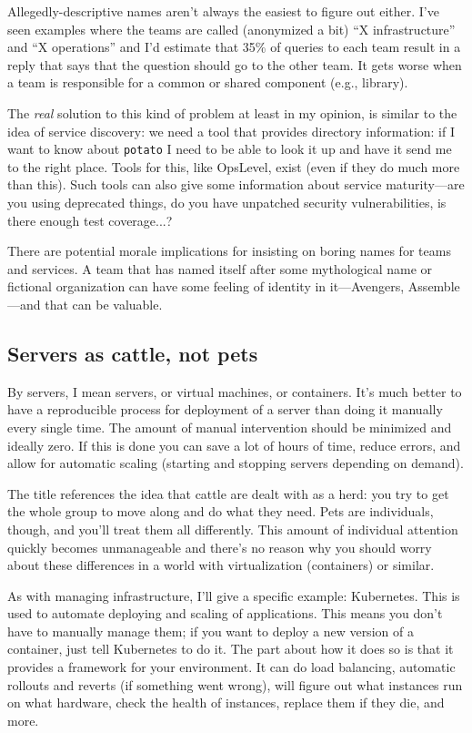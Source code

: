 Allegedly-descriptive names aren't always the easiest to figure out either. I've seen examples where the teams are called (anonymized a bit) ``X infrastructure'' and ``X operations'' and I'd estimate that 35\% of queries to each team result in a reply that says that the question should go to the other team. It gets worse when a team is responsible for a common or shared component (e.g., library). 

The \textit{real} solution to this kind of problem at least in my opinion, is similar to the idea of service discovery: we need a tool that provides directory information: if I want to know about \texttt{potato} I need to be able to look it up and have it send me to the right place. Tools for this, like OpsLevel, exist (even if they do much more than this). Such tools can also give some information about service maturity---are you using deprecated things, do you have unpatched security vulnerabilities, is there enough test coverage...?

There are potential morale implications for insisting on boring names for teams and services. A team that has named itself after some mythological name or fictional organization can have some feeling of identity in it---Avengers, Assemble---and that can be valuable. 

\subsection*{Servers as cattle, not pets}
By servers, I mean servers, or virtual machines, or containers. It's much better to have a reproducible process for deployment of a server than doing it manually every single time. The amount of manual intervention should be minimized and ideally zero. If this is done you can save a lot of hours of time, reduce errors, and allow for automatic scaling (starting and stopping servers depending on demand).

The title references the idea that cattle are dealt with as a herd: you try to get the whole group to move along and do what they need. Pets are individuals, though, and you'll treat them all differently. This amount of individual attention quickly becomes unmanageable and there's no reason why you should worry about these differences in a world with virtualization (containers) or similar. 

As with managing infrastructure, I'll give a specific example: Kubernetes. This is used to automate deploying and scaling of applications. This means you don't have to manually manage them; if you want to deploy a new version of a container, just tell Kubernetes to do it. The part about how it does so is that it provides a framework for your environment. It can do load balancing, automatic rollouts and reverts (if something went wrong), will figure out what instances run on what hardware, check the health of instances, replace them if they die, and more.

